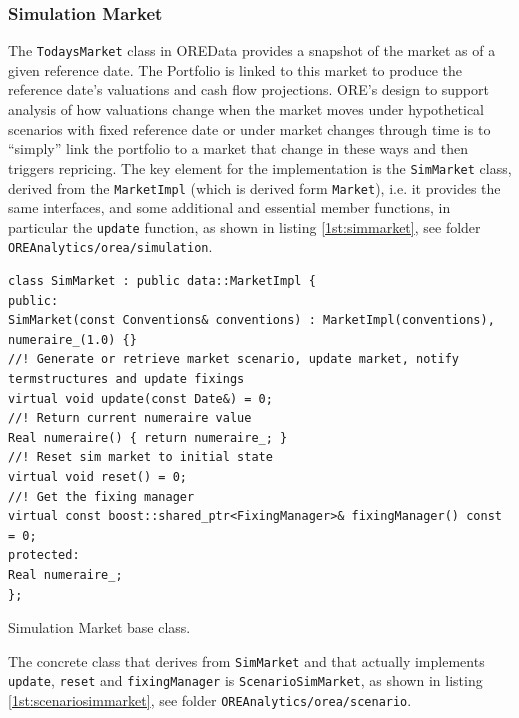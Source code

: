\documentclass[12pt, a4paper]{report}
\begin{document}
\subsubsection{Simulation Market}
The {\tt TodaysMarket} class in OREData provides a snapshot of the market as of a given reference date. The Portfolio is linked to this market to produce the reference date's valuations and cash flow projections. ORE's design to support analysis of how
valuations change when the market moves under hypothetical scenarios with fixed reference date or under market changes through time is to ``simply'' link the portfolio to a market that change in these ways and then triggers repricing. 
The key element for the implementation is the {\tt SimMarket} class, derived from the {\tt MarketImpl} (which is derived form {\tt Market}), i.e. it provides the same interfaces, and some additional and essential member functions, 
in particular the {\tt update} function, as shown in listing \ref{1st:simmarket}, see folder {\tt OREAnalytics/orea/simulation}.

\begin{listing}[H]
\begin{verbatim}
class SimMarket : public data::MarketImpl {
public:
SimMarket(const Conventions& conventions) : MarketImpl(conventions), numeraire_(1.0) {}
//! Generate or retrieve market scenario, update market, notify termstructures and update fixings
virtual void update(const Date&) = 0;
//! Return current numeraire value
Real numeraire() { return numeraire_; }
//! Reset sim market to initial state
virtual void reset() = 0;
//! Get the fixing manager
virtual const boost::shared_ptr<FixingManager>& fixingManager() const = 0;
protected:
Real numeraire_;
};
\end{verbatim}
\caption{Simulation Market base class.}
\label{1st:simmarket}
\end{listing}

The concrete class that derives from {\tt SimMarket} and that actually implements {\tt update}, {\tt reset} and {\tt fixingManager} is {\tt ScenarioSimMarket}, as shown in listing \ref{1st:scenariosimmarket}, see folder {\tt OREAnalytics/orea/scenario}.
\end{document}
